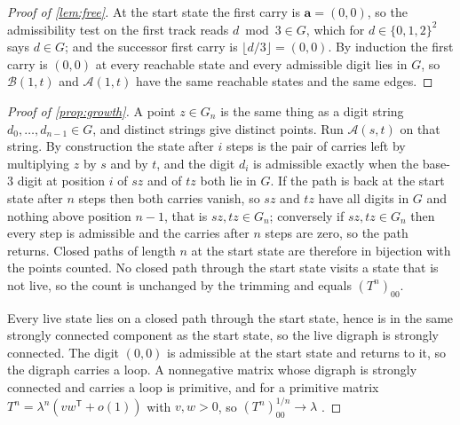 \documentclass[11pt]{amsart}
\theoremstyle{definition}
\theoremstyle{remark}
\begin{document}
\begin{proof}[Proof of \cref{lem:free}]
At the start state the first carry is $\mathbf{a}=(0,0)$, so the admissibility test on the first track reads $d\bmod 3\in G$, which for $d\in\{0,1,2\}^2$ says $d\in G$; and the successor first carry is $\lfloor d/3\rfloor=(0,0)$. By induction the first carry is $(0,0)$ at every reachable state and every admissible digit lies in $G$, so $\mathcal{B}(1,t)$ and $\mathcal{A}(1,t)$ have the same reachable states and the same edges.
\end{proof}

\begin{proof}[Proof of \cref{prop:growth}]
A point $z\in G_n$ is the same thing as a digit string $d_0,\dots,d_{n-1}\in G$, and distinct strings give distinct points. Run $\mathcal{A}(s,t)$ on that string. By construction the state after $i$ steps is the pair of carries left by multiplying $z$ by $s$ and by $t$, and the digit $d_i$ is admissible exactly when the base-$3$ digit at position $i$ of $sz$ and of $tz$ both lie in $G$. If the path is back at the start state after $n$ steps then both carries vanish, so $sz$ and $tz$ have all digits in $G$ and nothing above position $n-1$, that is $sz,tz\in G_n$; conversely if $sz,tz\in G_n$ then every step is admissible and the carries after $n$ steps are zero, so the path returns. Closed paths of length $n$ at the start state are therefore in bijection with the points counted. No closed path through the start state visits a state that is not live, so the count is unchanged by the trimming and equals $(T^n)_{00}$.

Every live state lies on a closed path through the start state, hence is in the same strongly connected component as the start state, so the live digraph is strongly connected. The digit $(0,0)$ is admissible at the start state and returns to it, so the digraph carries a loop. A nonnegative matrix whose digraph is strongly connected and carries a loop is primitive, and for a primitive matrix $T^n=\lambda^n(vw^{\mathsf T}+o(1))$ with $v,w>0$, so $(T^n)_{00}^{1/n}\to\lambda$ \cite[Ch.~1]{seneta}.
\end{proof}
\end{document}
